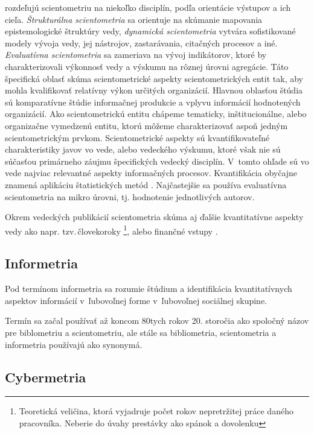 \citet{Glanzel2004} rozdeľujú scientometriu na niekoľko disciplín, podľa
orientácie výstupov a ich cieľa. \emph{Štrukturálna scientometria} sa orientuje
na skúmanie mapovania epistemologické štruktúry vedy, \emph{dynamická
scientometria} vytvára sofistikované modely vývoja vedy, jej nástrojov,
zastarávania, citačných procesov a iné. \emph{Evaluatívna scientometria} sa
zameriava na vývoj indikátorov, ktoré by charakterizovali výkonnosť vedy a
výskumu na rôznej úrovni agregácie.  Táto špecifická oblasť skúma
scientometrické aspekty scientometrických entit tak, aby mohla kvalifikovať
relatívny výkon určitých organizácií. Hlavnou oblasťou štúdia sú komparatívne štúdie
informačnej produkcie a vplyvu informácií hodnotených organizácií. Ako
scientometrickú entitu chápeme tematicky, inštitucionálne, alebo organizačne
vymedzenú entitu, ktorú môžeme charakterizovať aspoň jedným scientometrickým
prvkom. Scientometrické aspekty sú kvantifikovateľné charakteristiky javov vo
vede, alebo vedeckého výskumu, ktoré však nie sú súčasťou primárneho záujmu
špecifických vedecký disciplín. V~tomto ohľade sú vo vede najviac relevantné
aspekty informačných procesov. Kvantifikácia obyčajne znamená aplikáciu
štatistických metód \citep{Vinkler2001}.  Najčastejšie sa používa evaluatívna
scientometria na mikro úrovni, tj. hodnotenie jednotlivých autorov.

Okrem vedeckých publikácií scientometria skúma aj ďalšie kvantitatívne aspekty
vedy ako napr. tzv.\,človekoroky \footnote{Teoretická veličina, ktorá vyjadruje
počet rokov nepretržitej práce daného pracovníka. Neberie do úvahy prestávky ako
spánok a dovolenku}, alebo finančné vstupy \citep{Bellis2009}.


\subsection{Informetria}

Pod termínom informetria sa rozumie štúdium a identifikácia kvantitatívnych
aspektov informácií v~ľubovoľnej forme v~ľubovoľnej sociálnej skupine.

Termín sa začal používať až koncom 80tych rokov 20. storočia ako spoločný
názov pre biblometriu a scientometriu, ale stále sa bibliometria, scientometria a
informetria používajú ako synonymá.


\subsection{Cybermetria}

